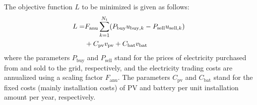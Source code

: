 \documentclass[lettersize,journal]{IEEEtran}
\begin{document}
The objective function $L$  to be minimized is given as follows:
\begin{align} \label{eq:cost_function}
 L = 
   & F_\mathrm{anu}  \sum_{k=1}^{N_\mathrm{t}}  (P_\mathrm{buy} u_{\mathrm{buy},k} - P_\mathrm{sell} u_{\mathrm{sell},k} )   \notag \\  
   &+ C_\mathrm{pv} v_\mathrm{pv} + C_\mathrm{bat} v_\mathrm{bat} 
\end{align}
where the parameters $P_\mathrm{buy}$ and $P_\mathrm{sell}$ stand for the prices of electricity purchased from and sold to the grid, respectively, and the electricity trading costs are annualized using a scaling factor $F_\mathrm{anu}$. 
The parameters $C_\mathrm{pv}$ and  $C_\mathrm{bat}$ stand for the fixed costs (mainly installation costs) of PV and battery per unit installation amount per year, respectively. 
\end{document}
